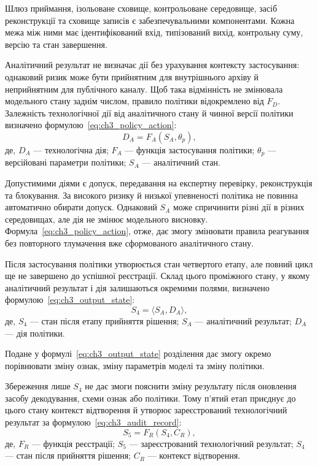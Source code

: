 Шлюз приймання, ізольоване сховище, контрольоване середовище, засіб реконструкції та сховище записів є забезпечувальними компонентами. Кожна межа між ними має ідентифікований вхід, типізований вихід, контрольну суму, версію та стан завершення.

Аналітичний результат не визначає дії без урахування контексту застосування: однаковий ризик може бути прийнятним для внутрішнього архіву й неприйнятним для публічного каналу. Щоб така відмінність не змінювала модельного стану заднім числом, правило політики відокремлено від $F_D$. Залежність технологічної дії від аналітичного стану й чинної версії політики визначено формулою~\eqref{eq:ch3_policy_action}:
\begin{equation}
D_A=F_A(S_A,\theta_p),
\label{eq:ch3_policy_action}
\end{equation}
де, $D_A$ --- технологічна дія; $F_A$ --- функція застосування політики; $\theta_p$ --- версійовані параметри політики; $S_A$ --- аналітичний стан.

Допустимими діями є допуск, передавання на експертну перевірку, реконструкція та блокування. За високого ризику й низької упевненості політика не повинна автоматично обирати допуск. Однаковий $S_A$ може спричинити різні дії в різних середовищах, але дія не змінює модельного висновку. Формула~\eqref{eq:ch3_policy_action}, отже, дає змогу змінювати правила реагування без повторного тлумачення вже сформованого аналітичного стану.

Після застосування політики утворюється стан четвертого етапу, але повний цикл ще не завершено до успішної реєстрації. Склад цього проміжного стану, у якому аналітичний результат і дія залишаються окремими полями, визначено формулою~\eqref{eq:ch3_output_state}:
\begin{equation}
S_4=\langle S_A,D_A\rangle,
\label{eq:ch3_output_state}
\end{equation}
де, $S_4$ --- стан після етапу прийняття рішення; $S_A$ --- аналітичний результат; $D_A$ --- дія політики.

Подане у формулі~\eqref{eq:ch3_output_state} розділення дає змогу окремо порівнювати зміну ознак, зміну параметрів моделі та зміну політики.

Збереження лише $S_4$ не дає змоги пояснити зміну результату після оновлення засобу декодування, схеми ознак або політики. Тому п’ятий етап приєднує до цього стану контекст відтворення й утворює зареєстрований технологічний результат за формулою~\eqref{eq:ch3_audit_record}:
\begin{equation}
S_5=F_R(S_4,C_R),
\label{eq:ch3_audit_record}
\end{equation}
де, $F_R$ --- функція реєстрації; $S_5$ --- зареєстрований технологічний результат; $S_4$ --- стан після прийняття рішення; $C_R$ --- контекст відтворення.


